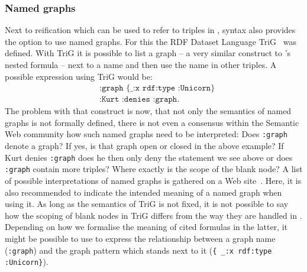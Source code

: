 
% 

\subsubsection{Named graphs}
Next to reification which can be used to refer to triples in \rdf, \rdf syntax also provides the option to use named graphs. For this the RDF Dataset Language TriG~\cite{TriG} was defined. With TriG it is possible to 
list a graph -- a very similar construct to \nthree's nested formula -- next to a name and then use the name in other triples. A possible expression using TriG would be:
\begin{equation}
 \begin{split}
& \texttt{:graph } \texttt{\{ \_:x rdf:type :Unicorn\}}\\
& \texttt{:Kurt } \texttt{:denies :graph.}
 \end{split}
\end{equation}
The problem with that construct is now, that not only the semantics of named graphs is not formally defined, there is not even a consensus within the Semantic Web community how 
such named graphs need to be interpreted: Does \texttt{:graph} denote a graph? If yes, is that graph open or closed in the above example? If Kurt denies \texttt{:graph} does he then only deny the statement we see above or does 
\texttt{:graph} contain more triples? Where exactly is the scope of the blank node? A list of possible interpretations of named graphs is gathered on a Web site~\cite{TriGsemantics}. 
Here, it is also recommended to indicate the intended meaning of a named graph when using it. As long as the semantics of TriG is not fixed, it is not possible to say how the scoping 
of blank nodes in TriG differs from the way they are handled in \nthree. Depending on how we formalise the meaning of cited formulas in the latter, it might be possible to use \nthree to 
express the relationship between a graph name (\texttt{:graph}) and the graph pattern which stands next to it (\texttt{\{ \_:x rdf:type :Unicorn\}}).

